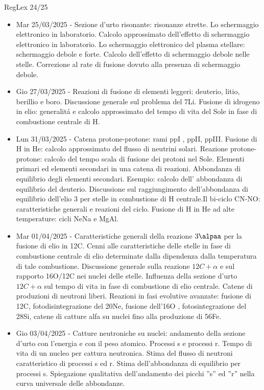 \begin{frame}{RegLex 24/25}
\begin{itemize}
\item Mar 25/03/2025 - Sezione d'urto risonante: risonanze strette. Lo schermaggio elettronico in laboratorio. Calcolo approssimato dell'effetto di schermaggio elettronico in laboratorio. Lo schermaggio elettronico del plasma stellare: schermaggio debole e forte. Calcolo dell'effetto di schermaggio debole nelle stelle. Correzione al rate di fusione dovuto alla presenza di schermaggio debole.
\item Gio 27/03/2025 - Reazioni di fusione di elementi leggeri: deuterio, litio, berillio e boro. Discussione generale sul problema del 7Li. Fusione di idrogeno in elio: generalit\'a e calcolo approssimato del tempo di vita del Sole in fase di combustione centrale di H.
\item Lun 31/03/2025 - Catena protone-protone: rami ppI , ppII, ppIII. Fusione di H in He: calcolo approssimato del flusso di neutrini solari. Reazione protone-protone: calcolo del tempo scala di fusione dei protoni nel Sole. Elementi primari ed elementi secondari in una catena di reazioni. Abbondanza di equilibrio degli elementi secondari. Esempio: calcolo dell' abbondanza di equilibrio del deuterio. Discussione sul raggiungimento dell'abbondanza di equilibrio dell'elio 3 per stelle in combustione di H centrale.Il bi-ciclo CN-NO: caratteristiche generali e reazioni del ciclo. Fusione di H in He ad alte temperature: cicli NeNa e MgAl.
\item Mar 01/04/2025 - Caratteristiche generali della reazione $3\alpaa$ per la fusione di elio in 12C. Cenni alle caratteristiche delle stelle in fase di combustione centrale di elio determinate dalla dipendenza dalla temperatura di tale combustione. Discussione generale sulla reazione $12C+\alpha$ e sul rapporto 16O/12C nei nuclei delle stelle. Influenza della sezione d'urto $12C+\alpha$ sul tempo di vita in fase di combustione di elio centrale. Catene di produzioni di neutroni liberi. Reazioni in fasi evolutive avanzate: fusione di 12C, fotodisintegrazione del 20Ne, fusione dell'16O , fotosintegrazione del 28Si, catene di catture alfa su nuclei fino alla produzione di 56Fe.
\item Gio 03/04/2025 - Catture neutroniche su nuclei: andamento della sezione d'urto con l'energia e con il peso atomico. Processi s e processi r. Tempo di vita di un nucleo per cattura neutronica. Stima del flusso di neutroni caratteristico di processi s ed r. Stima dell'abbondanza di equilibrio per processi s. Spiegazione qualitativa dell'andamento dei picchi ''s'' ed ''r'' nella curva universale delle abbondanze.

\end{itemize}
\end{frame}
